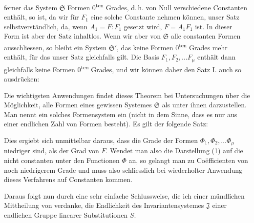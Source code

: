 ferner das System $\mathfrak{S}$ Formen 0\textsuperscript{ten} Grades, d.\,h. von Null verschiedene Constanten enthält, so ist, da wir für $F_1$ eine solche Constante nehmen können, unser Satz selbstverständlich, da, wenn $A_1 = F : F_1$ gesetzt wird, $F = A_1F_1$ ist. In dieser Form ist aber der Satz inhaltlos. Wenn wir aber von $\mathfrak{S}$ alle constanten Formen ausschliessen, so bleibt ein System $\mathfrak{S}'$, das keine Formen 0\textsuperscript{ten} Grades mehr enthält, für das unser Satz gleichfalls gilt. Die Basis $F_1, F_2, \ldots F_\mu$ enthält dann gleichfalls keine Formen 0\textsuperscript{ten} Grades, und wir können daher den Satz I. auch so ausdrücken:


Die wichtigsten Anwendungen findet dieses Theorem bei Untersuchungen über die Möglichkeit, alle Formen eines gewissen Systemes $\mathfrak{S}$ als  unter ihnen darzustellen. Man nennt ein solches Formensystem ein  (nicht in dem Sinne, dass es nur aus einer endlichen Zahl von Formen besteht). Es gilt der folgende Satz:


Dies ergiebt sich unmittelbar daraus, dass die Grade der Formen $\Phi_1, \Phi_2, \ldots \Phi_\mu$ niedriger sind, als der Grad von $F$. Wendet man also die Darstellung (1) auf die nicht constanten unter den Functionen $\Phi$ an, so gelangt man zu Co\"efficienten von noch niedrigerem Grade und muss also schliesslich bei wiederholter Anwendung dieses Verfahrens auf Constanten kommen.

Daraus folgt nun durch eine sehr einfache Schlussweise, die ich einer mündlichen Mittheilung von  verdanke, die Endlichkeit des Invariantensystemes $\mathfrak{J}$ einer endlichen Gruppe linearer Substitutionen $S$.
